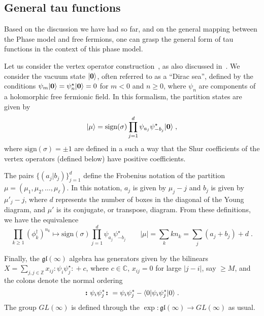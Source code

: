 \documentclass[a4paper,11pt]{amsart}
\begin{document}

\subsection{General tau functions}
Based on the discussion we have had so far, and on the general mapping
between the Phase model and free fermions, one can grasp the general
form of tau functions in the context of this phase model.

Let us consider the vertex operator construction~\cite{Okounkov2001},
as also discussed in~\cite{Alexandrov:2012tr, Wheeler:2010vmq}. We
consider the vacuum state \(\lvert\bm{0}\rangle\), often referred to as a
``Dirac sea'', defined by the conditions \(\psi_m\lvert\bm{0}\rangle =
\psi_n^\star\lvert\bm{0}\rangle =0 \) for \(m<0\) and \(n \geq 0\), where
\(\psi_n\) are components of a holomorphic free fermionic field. In
this formalism, the partition states are given by
\begin{equation}
  \lvert\mu\rangle = \textrm{sign}(\sigma) \prod_{j=1}^d \psi_{a_j} \psi^\star_{-b_j}\lvert\bm{0}\rangle\; ,
\end{equation}
where \(\textrm{sign}(\sigma) = \pm 1\) are defined in a such a way
that the Shur coefficients of the vertex operators (defined below)
have positive coefficients.

The pairs \(\{(a_j|b_j)\}_{j=1}^d\) define the Frobenius notation of
the partition \(\mu = (\mu_1, \mu_2, \dots, \mu_\ell)\). In this
notation, \(a_j\) is given by \(\mu_j - j\) and \(b_j\) is given by
\(\mu'_j - j\), where \(d\) represents the number of boxes in the
diagonal of the Young diagram, and \(\mu'\) is its conjugate, or
transpose, diagram. From these definitions, we have the equivalence
\begin{equation}
  \prod_{k\geq 1} (\phi_k^\dagger)^{n_k} \mapsto \textrm{sign}(\sigma) \prod_{j=1}^d
  \psi_{a_j} \psi^\star_{-b_j} \qquad |\mu| = \sum_k k n_k = \sum_j(a_j + b_j) + d\; .
\end{equation}

Finally, the \(\mathfrak{gl}(\infty)\) algebra has generators given by the
bilinears \(X = \sum_{j, j \in \mathbb{Z}} x_{ij} \bm{\colon} \psi_i \psi_j^\star\bm{\colon}
+ c\), where \(c\in \mathbb{C}\), \(x_{ij} =
0\) for large \(|j -i|\), say \(\geq M\), and the colons denote the normal ordering
\begin{equation}
  \bm{\colon} \psi_i \psi_j^\ast \bm{\colon} =  \psi_i \psi_j^\ast
  - \langle0\rvert \psi_i \psi_j^\ast \lvert0\rangle \; .
\end{equation}
The group \(GL(\infty)\) is defined through the \(\exp:
\mathfrak{gl}(\infty) \to GL(\infty)\) as usual.
\end{document}
